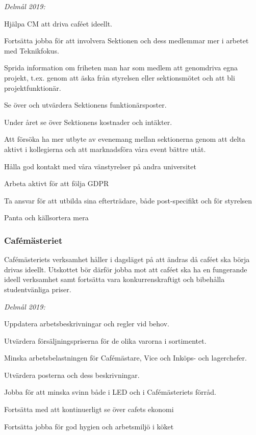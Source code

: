 \documentclass[../_main/handlingar.tex]{subfiles}
\begin{document}
\emph{Delmål 2019:}
\begin{dashlist}
    \item Hjälpa CM att driva caféet ideellt. 
    \item Fortsätta jobba för att involvera Sektionen och dess medlemmar mer i arbetet med Teknikfokus. 
    \item Sprida information om friheten man har som medlem att genomdriva egna projekt, t.ex. genom att äska från styrelsen eller sektionsmötet och att bli projektfunktionär. 
    \item Se över och utvärdera Sektionens funktionärsposter. 
    \item Under året se över Sektionens kostnader och intäkter. 
    \item Att försöka ha mer utbyte av evenemang mellan sektionerna genom att delta aktivt i kollegierna och att marknadsföra våra event bättre utåt. 
    \item Hålla god kontakt med våra vänstyrelser på andra universitet
    \item Arbeta aktivt för att följa GDPR
    \item Ta ansvar för att utbilda sina efterträdare, både post-specifikt och för styrelsen
    \item Panta och källsortera mera \scalebox{0.5}{\recycle}
\end{dashlist}

\subsubsection*{Cafémästeriet}
Cafémästeriets verksamhet håller i dagsläget på att ändras då caféet ska börja drivas ideellt. Utskottet bör därför jobba mot att caféet ska ha en fungerande ideell verksamhet samt fortsätta vara konkurrenskraftigt och bibehålla studentvänliga priser. 

\emph{Delmål 2019:}
\begin{dashlist}
    \item Uppdatera arbetsbeskrivningar och regler vid behov. 
    \item Utvärdera försäljningspriserna för de olika varorna i sortimentet. 
    \item Minska arbetsbelastningen för Cafémästare, Vice och Inköps- och lagerchefer. 
    \item Utvärdera posterna och dess beskrivningar. 
    \item Jobba för att minska svinn både i LED och i Cafémästeriets förråd.
    \item Fortsätta med att kontinuerligt se över cafets ekonomi
    \item Fortsätta jobba för god hygien och arbetsmiljö i köket
\end{dashlist}
\end{document}
